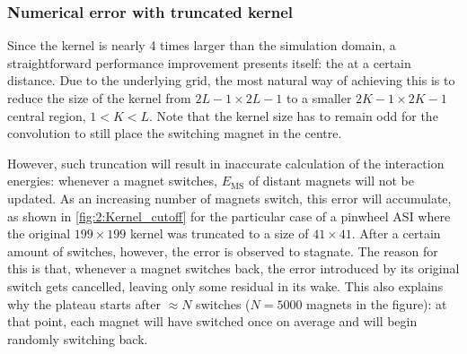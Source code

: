 \subsubsection{Numerical error with truncated kernel}\label{sec:2:Kernels:Error}
Since the kernel is nearly 4 times larger than the simulation domain, a straightforward performance improvement presents itself:  the  at a certain distance.
Due to the underlying grid, the most natural way of achieving this is to reduce the size of the kernel from $2L-1 \times 2L-1$ to a smaller $2K-1 \times 2K-1$ central region, $1 < K < L$.
Note that the kernel size has to remain odd for the convolution to still place the switching magnet in the centre. \par
However, such truncation will result in inaccurate calculation of the interaction energies: whenever a magnet switches, $E_\mathrm{MS}$ of distant magnets will not be updated.
As an increasing number of magnets switch, this error will accumulate, as shown in \cref{fig:2:Kernel_cutoff} for the particular case of a pinwheel ASI where the original $199 \times 199$ kernel was truncated to a size of $41 \times 41$.
After a certain amount of switches, however, the error is observed to stagnate.
The reason for this is that, whenever a magnet switches back, the error introduced by its original switch gets cancelled, leaving only some residual  in its wake.
This also explains why the plateau starts after $\approx N$ switches ($N=5000$ magnets in the figure): at that point, each magnet will have switched once on average and will begin randomly switching back.

\vspace{-1em}
\vspace{-1em}

